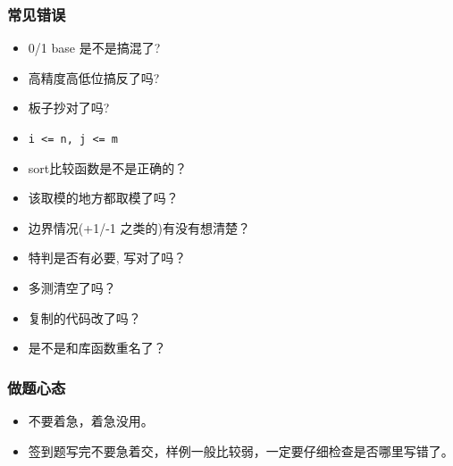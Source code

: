 \documentclass[a4paper, twoside]{article}
\begin{document}
    \subsubsection{常见错误}
    \begin{itemize}
        \item 0/1 base 是不是搞混了?
        \item 高精度高低位搞反了吗?
        \item 板子抄对了吗?
        \item \texttt{i <= n, j <= m}
        \item sort比较函数是不是正确的？
        \item 该取模的地方都取模了吗？
        \item 边界情况(+1/-1 之类的)有没有想清楚？
        \item 特判是否有必要, 写对了吗？
        \item 多测清空了吗？
        \item 复制的代码改了吗？
        \item 是不是和库函数重名了？
    \end{itemize}

    \subsubsection{做题心态}
    \begin{itemize}
        \item 不要着急，着急没用。
        \item 签到题写完不要急着交，样例一般比较弱，一定要仔细检查是否哪里写错了。
    \end{itemize}

\newpage
\end{document}
